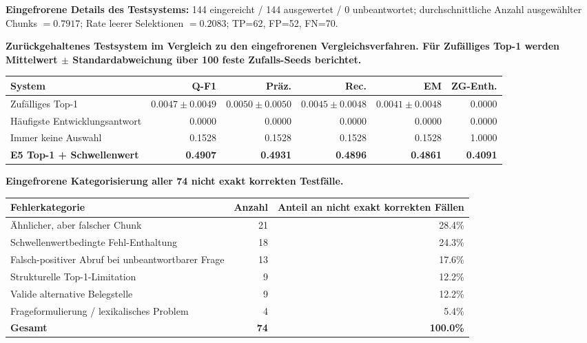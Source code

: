 \documentclass[11pt]{article}
\begin{document}
\begin{faktenbox}
\vspace{1ex}
\textbf{Eingefrorene Details des Testsystems:} 144 eingereicht / 144 ausgewertet / 0 unbeantwortet; durchschnittliche Anzahl ausgewählter Chunks $=0.7917$; Rate leerer Selektionen $=0.2083$; TP=62, FP=52, FN=70.

\vspace{1.5ex}
\begin{center}
\small
\textbf{Zurückgehaltenes Testsystem im Vergleich zu den eingefrorenen Vergleichsverfahren. Für Zufälliges Top-1 werden Mittelwert $\pm$ Standardabweichung über 100 feste Zufalls-Seeds berichtet.}\\[1ex]
\begin{tabular}{lrrrrr}
\toprule
\textbf{System} & \textbf{Q-F1} & \textbf{Präz.} & \textbf{Rec.} & \textbf{EM} & \textbf{ZG-Enth.} \\
\midrule
Zufälliges Top-1 & $0.0047\pm0.0049$ & $0.0050\pm0.0050$ & $0.0045\pm0.0048$ & $0.0041\pm0.0048$ & 0.0000 \\
Häufigste Entwicklungsantwort & 0.0000 & 0.0000 & 0.0000 & 0.0000 & 0.0000 \\
Immer keine Auswahl & 0.1528 & 0.1528 & 0.1528 & 0.1528 & 1.0000 \\
\textbf{E5 Top-1 + Schwellenwert} & \textbf{0.4907} & \textbf{0.4931} & \textbf{0.4896} & \textbf{0.4861} & \textbf{0.4091} \\
\bottomrule
\end{tabular}
\end{center}

\vspace{1.5ex}
\begin{center}
\small
\textbf{Eingefrorene Kategorisierung aller 74 nicht exakt korrekten Testfälle.}\\[1ex]
\begin{tabular}{lrr}
\toprule
\textbf{Fehlerkategorie} & \textbf{Anzahl} & \textbf{Anteil an nicht exakt korrekten Fällen} \\
\midrule
Ähnlicher, aber falscher Chunk & 21 & 28.4\% \\
Schwellenwertbedingte Fehl-Enthaltung & 18 & 24.3\% \\
Falsch-positiver Abruf bei unbeantwortbarer Frage & 13 & 17.6\% \\
Strukturelle Top-1-Limitation & 9 & 12.2\% \\
Valide alternative Belegstelle & 9 & 12.2\% \\
Frageformulierung / lexikalisches Problem & 4 & 5.4\% \\
\midrule
\textbf{Gesamt} & \textbf{74} & \textbf{100.0\%} \\
\bottomrule
\end{tabular}
\end{center}
\end{faktenbox}
\end{document}

